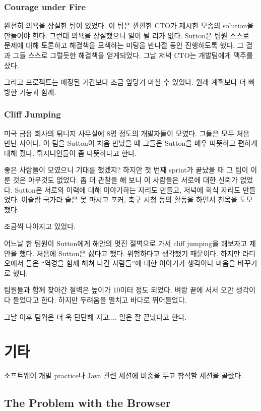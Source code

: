 \documentclass[11pt]{article}
\begin{document}
\subsubsection{Courage under Fire}
 
완전히 의욕을 상실한 팀이 있었다. 이 팀은 깐깐한 CTO가 제시한 모종의 solution을
만들어야 한다. 그런데 의욕을 상실했으니 일이 될 리가 없다. Sutton은
팀원 스스로 문제에 대해 토론하고 해결책을 모색하는 미팅을 반나절 동안
진행하도록 했다. 그 결과 그들 스스로 그럴듯한 해결책을 얻게되었다. 그날
저녁 CTO는 개발팀에게 맥주를 샀다.
 
그리고 프로젝트는 예정된 기간보다 조금 앞당겨 마칠 수 
있었다. 원래 계획보다 더 빠방한 기능과 함께.

\subsubsection{Cliff Jumping}
 
미국 금융 회사의 튀니지 사무실에 8명 정도의 개발자들이 모였다. 그들은
모두 처음 만난 사이다.  이 팀을 Sutton이 처음 만났을 때 그들은 Sutton을
매우 따뜻하고 편하게 대해 줬다. 튀지니인들이 좀 다뜻하다고 한다.
 
좋은 사람들이 모였으니 기대를 했겠지? 하지만 첫 번째 sprint가 끝났을 때
그 팀이 이룬 것은 아무것도 없었다. 좀 더 관찰을 해 보니 이 사람들은
서로에 대한 신뢰가 없었다. Sutton은 서로의 이력에 대해 이야기하는
자리도 만들고, 저녁에 회식 자리도 만들었다. 이슬람 국가라 술은 못
마시고 포커, 축구 시청 등의 활동을 하면서 친목을 도모했다.
 
조금씩 나아지고 있었다.
 
어느날 한 팀원이 Sutton에게 해안의 멋진 절벽으로 가서 cliff jumping을
해보자고 제안을 했다. 처음에 Sutton은 싫다고 했다. 위험하다고 생각했기
때문이다.  하지만 라디오에서 들은 ``역경을 함께 헤쳐 나간 사람들''에 대한
이야기가 생각이나 마음을 바꾸기로 했다.
 
팀원들과 함께 찾아간 절벽은 높이가 10미터 정도 되었다. 벼랑 끝에 서서
오만 생각이 다 들었다고 한다. 하지만 두려움을 떨치고 바다로
뛰어들었다.
 
그날 이후 팀웍은 더 욱 단단해 지고.... 일은 잘 끝났다고 한다.
 
\section{기타}

소프트웨어 개발 practice나 Java 관련 세션에 비중을 두고 참석할 세션을
골랐다.

\subsection{The Problem with the Browser}
\end{document}
